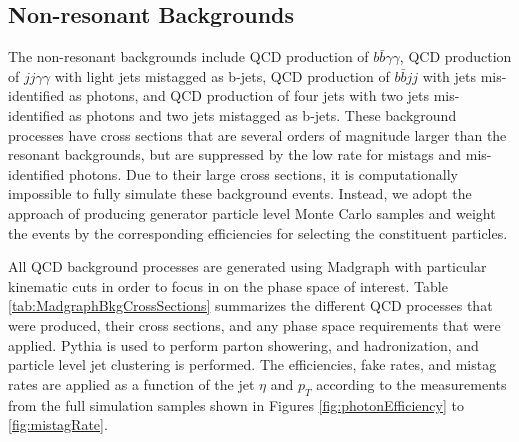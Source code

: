 \documentclass{cmspaper}
\begin{document}
\subsection{Non-resonant Backgrounds}
The non-resonant backgrounds include QCD production of $b \bar{b} \gamma\gamma$, QCD production
of $jj \gamma\gamma$ with light jets mistagged as b-jets, QCD production of $b \bar{b} jj$ with
jets mis-identified as photons, and QCD production of four jets with two jets mis-identified 
as photons and two jets mistagged as b-jets. These background processes have cross sections
that are several orders of magnitude larger than the resonant backgrounds, but are suppressed
by the low rate for mistags and mis-identified photons. Due to their large cross sections, 
it is computationally impossible to fully simulate these background events. Instead, we adopt the
approach of producing generator particle level Monte Carlo samples and weight the events by the
corresponding efficiencies for selecting the constituent particles.

All QCD background processes are generated using Madgraph \cite{madgraph} with particular kinematic
cuts in order to focus in on the phase space of interest. Table \ref{tab:MadgraphBkgCrossSections} 
summarizes the different QCD processes that were produced, their cross sections, 
and any phase space requirements that were applied. Pythia is used to perform parton showering,
and hadronization, and particle level jet clustering is performed. The efficiencies, fake rates, and
mistag rates are applied as a function of the jet $\eta$ and $p_{T}$ according to the measurements
from the full simulation samples shown in Figures \ref{fig:photonEfficiency} to \ref{fig:mistagRate}.
\end{document}
